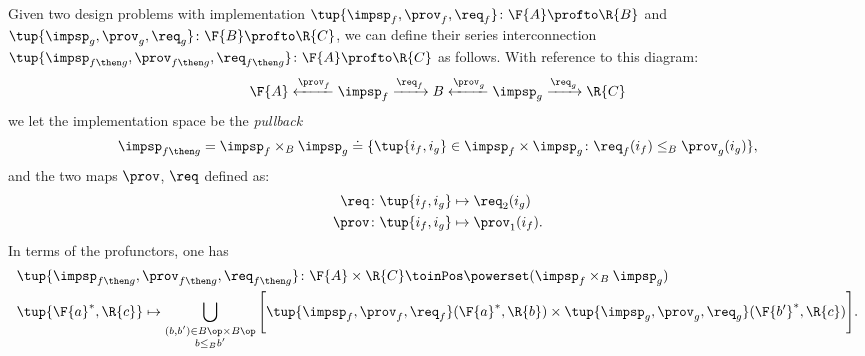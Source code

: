 \begin{definition}
\label{def:seriesdpi}
Given two design problems with implementation $\tup{\impsp_f,\prov_f,\req_f}\colon \F{A}\profto \R{B}$
and $\tup{\impsp_g,\prov_g,\req_g}\colon \F{B}\profto \R{C}$, we can define their
series interconnection $\tup{\impsp_{f\then g},\prov_{f\then g},\req_{f\then g}}\colon \F{A}\profto \R{C}$ as follows.
With reference to this diagram:
\begin{equation}
\F{A} \xleftarrow{\prov_f} \impsp_f \xrightarrow{\req_f} B
\xleftarrow{\prov_g} \impsp_g \xrightarrow{\req_g} \R{C}
\end{equation}
we let the implementation space be the \emph{pullback}
\begin{equation}
\begin{aligned}
\impsp_{f\then g}&= \impsp_f \times_B \impsp_g \doteq \{
\tup{i_f,i_g} \in \impsp_f \times \impsp_g \colon
\req_f(i_f) \leq_{B} \prov_g(i_g)
\},\\
\end{aligned}
\end{equation}
and the two maps $\prov$, $\req$ defined as:
\begin{equation}
\begin{aligned}
\req  &\colon \tup{i_f,i_g} \mapsto \req_2(i_g)\\
\prov  &\colon  \tup{i_f,i_g} \mapsto \prov_1(i_f).
\end{aligned}
\end{equation}
In terms of the profunctors, one has
\begin{equation}
\label{eq:seriesdpi}
\begin{aligned}
&\tup{\impsp_{f\then g},\prov_{f\then g},\req_{f\then g}}\colon \F{A}\times \R{C} \toinPos \powerset(\impsp_f \times_B \impsp_g) \\
&\tup{\F{a}^*,\R{c}} \mapsto \bigcup_{\substack{(b,b') \in B\op \times B\op \\ b \leq_B b'}} \Bigg[ \tup{\impsp_f,\prov_f,\req_f}(\F{a}^*,\R{b}) \times \tup{\impsp_g,\prov_g,\req_g}(\F{b'}^*,\R{c}) \Bigg].
\end{aligned}
\end{equation}
\end{definition}

